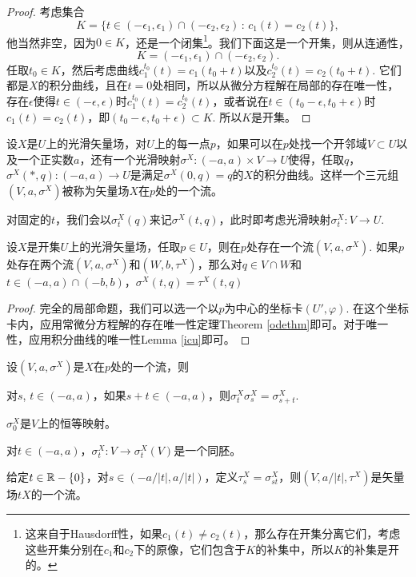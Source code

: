 \begin{proof}
考虑集合
\[
	K=\{t\in (-\epsilon_1,\epsilon_1)\cap (-\epsilon_2,\epsilon_2)\,:\,c_1(t)=c_2(t)\},
\]
他当然非空，因为$0\in K$，还是一个闭集\footnote{这来自于Hausdorff性，如果$c_1(t)\neq c_2(t)$，那么存在开集分离它们，考虑这些开集分别在$c_1$和$c_2$下的原像，它们包含于$K$的补集中，所以$K$的补集是开的。}。我们下面这是一个开集，则从连通性，
\[
	K=(-\epsilon_1,\epsilon_1)\cap (-\epsilon_2,\epsilon_2).
\]
任取$t_0\in K$，然后考虑曲线$c_1^{t_0}(t)=c_1(t_0+t)$以及$c_2^{t_0}(t)=c_2(t_0+t)$. 它们都是$X$的积分曲线，且在$t=0$处相同，所以从微分方程解在局部的存在唯一性，存在$\epsilon$使得$t\in (-\epsilon,\epsilon)$时$c_1^{t_0}(t)=c_2^{t_0}(t)$，或者说在$t\in (t_0-\epsilon,t_0+\epsilon)$时$c_1(t)=c_2(t)$，即$(t_0-\epsilon,t_0+\epsilon)\subset K$. 所以$K$是开集。
\end{proof}

\begin{para}[矢量场的流]
设$X$是$U$上的光滑矢量场，对$U$上的每一点$p$，如果可以在$p$处找一个开邻域$V\subset U$以及一个正实数$a$，还有一个光滑映射$\sigma^X:(-a,a)\times V\to U$使得，任取$q$，$\sigma^X(*,q):(-a,a)\to U$是满足$\sigma^X(0,q)=q$的$X$的积分曲线。这样一个三元组$(V,a,\sigma^X)$被称为矢量场$X$在$p$处的一个流。
\end{para}

对固定的$t$，我们会以$\sigma^X_t(q)$来记$\sigma^X(t,q)$，此时即考虑光滑映射$\sigma^X_t:V\to U$.

\begin{thm}[局部流的存在唯一性]
设$X$是开集$U$上的光滑矢量场，任取$p\in U$，则在$p$处存在一个流$(V,a,\sigma^X)$. 如果$p$处存在两个流$(V,a,\sigma^X)$和$(W,b,\tau^X)$，那么对$q\in V\cap W$和$t\in (-a,a)\cap (-b,b)$，$\sigma^X(t,q)=\tau^X(t,q)$
\end{thm}

\begin{proof}
完全的局部命题，我们可以选一个以$p$为中心的坐标卡$(U',\varphi)$. 在这个坐标卡内，应用常微分方程解的存在唯一性定理Theorem \ref{odethm}即可。对于唯一性，应用积分曲线的唯一性Lemma \ref{icu}即可。
\end{proof}

\begin{pro}
设$(V,a,\sigma^X)$是$X$在$p$处的一个流，则
\begin{compactenum}
\item 对$s$, $t\in (-a,a)$，如果$s+t\in (-a,a)$，则$\sigma^X_t\sigma^X_s=\sigma^X_{s+t}$.
\item $\sigma^X_0$是$V$上的恒等映射。
\item 对$t\in (-a,a)$，$\sigma^X_t:V\to \sigma^X_t(V)$是一个同胚。
\item 给定$t\in \mathbb{R}-\{0\}$，对$s\in (-a/|t|,a/|t|)$，定义$\tau^X_{s}=\sigma^X_{st}$，则$(V,a/|t|,\tau^X)$是矢量场$tX$的一个流。
\end{compactenum}
\end{pro}

